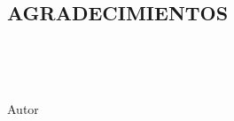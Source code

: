 \pagestyle{fancy}
\begin{center}
    \vspace*{\fill} %
        \begin{center} %
                \section*{\Large{\textbf{AGRADECIMIENTOS}}}
                \begin{justify}
                    \lipsum[1][1-10]\\
                \end{justify}
            
                \begin{justify}
                    \lipsum[1][1-8]\\
                \end{justify}
            
                \begin{flushright}
                    Autor
                \end{flushright}
        \end{center}
    \vfill %
\end{center}